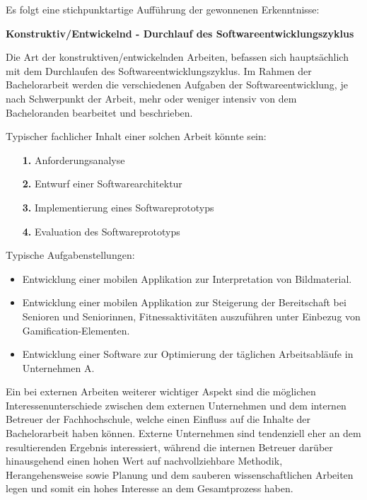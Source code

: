 \documentclass[bibliography=totoc,listof=totoc,BCOR=5mm,DIV=12,oneside]{scrbook}
\begin{document}
\par\medskip Es folgt eine stichpunktartige Aufführung der gewonnenen Erkenntnisse:


\par \bigskip \textbf{Konstruktiv/Entwickelnd - Durchlauf des Softwareentwicklungszyklus}
\par \medskip Die Art der konstruktiven/entwickelnden Arbeiten, befassen sich hauptsächlich mit dem Durchlaufen des Softwareentwicklungszyklus. Im Rahmen der Bachelorarbeit werden die verschiedenen Aufgaben der Softwareentwicklung, je nach Schwerpunkt der Arbeit, mehr oder weniger intensiv von dem Bacheloranden bearbeitet und beschrieben.
\par \medskip Typischer fachlicher Inhalt einer solchen Arbeit könnte sein:
\begin{itemize}
\item[\textbf{1.}] Anforderungsanalyse
\item[\textbf{2.}] Entwurf einer Softwarearchitektur
\item[\textbf{3.}] Implementierung eines Softwareprototyps
\item[\textbf{4.}] Evaluation des Softwareprototyps
\end{itemize}

\par \medskip Typische Aufgabenstellungen:
\begin{itemize}
\item Entwicklung einer mobilen Applikation zur Interpretation von Bildmaterial.
\item Entwicklung einer mobilen Applikation zur Steigerung der Bereitschaft bei Senioren und Seniorinnen, Fitnessaktivitäten auszuführen unter Einbezug von  Gamification-Elementen.
\item Entwicklung einer Software zur Optimierung der täglichen Arbeitsabläufe in Unternehmen A.
\end{itemize}

\par \medskip Ein bei externen Arbeiten weiterer wichtiger Aspekt sind die möglichen Interessenunterschiede zwischen dem externen Unternehmen und dem internen Betreuer der Fachhochschule, welche einen Einfluss auf die Inhalte der Bachelorarbeit haben können. Externe Unternehmen sind tendenziell eher an dem resultierenden Ergebnis interessiert, während die internen Betreuer darüber hinausgehend einen hohen Wert auf nachvollziehbare Methodik, Herangehensweise sowie Planung und dem sauberen wissenschaftlichen Arbeiten legen und somit ein  hohes Interesse an dem Gesamtprozess haben.
\end{document}
